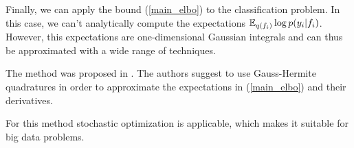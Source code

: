 \label{svi_classification}
Finally, we can apply the bound (\ref{main_elbo}) to the classification problem. In this case, we can't analytically compute the expectations $\mathbb{E}_{q(f_i)} \log p(y_i | f_i)$. However, this expectations are one-dimensional Gaussian integrals and can thus be approximated with a wide range of techniques. 

The method was proposed in \cite{SVIclassification}. The authors suggest to use Gauss-Hermite quadratures in order to approximate the expectations in (\ref{main_elbo}) and their derivatives. 

For this method stochastic optimization is applicable, which makes it suitable for big data problems.

